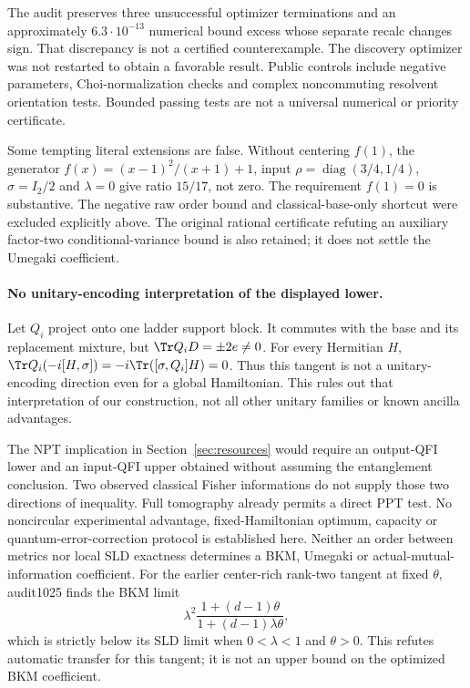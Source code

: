 The audit preserves three unsuccessful optimizer terminations and an approximately \(6.3\cdot10^{-13}\) numerical bound excess whose separate recalc changes sign. That discrepancy is not a certified counterexample. The discovery optimizer was not restarted to obtain a favorable result. Public controls include negative parameters, Choi-normalization checks and complex noncommuting resolvent orientation tests. Bounded passing tests are not a universal numerical or priority certificate.

Some tempting literal extensions are false. Without centering \(f(1)\), the generator \(f(x)=(x-1)^2/(x+1)+1\), input \(\rho=\operatorname{diag}(3/4,1/4)\), \(\sigma=I_2/2\) and \(\lambda=0\) give ratio \(15/17\), not zero. The requirement \(f(1)=0\) is substantive. The negative raw order bound and classical-base-only shortcut were excluded explicitly above. The original rational certificate refuting an auxiliary factor-two conditional-variance bound is also retained; it does not settle the Umegaki coefficient.

\paragraph{No unitary-encoding interpretation of the displayed lower.}
Let \(Q_i\) project onto one ladder support block. It commutes with the base and its replacement mixture, but \(\Tr Q_iD=\pm2e\ne0\). For every Hermitian \(H\),
\(\Tr Q_i(-i[H,\sigma])=-i\Tr([\sigma,Q_i]H)=0\).
Thus this tangent is not a unitary-encoding direction even for a global Hamiltonian. This rules out that interpretation of our construction, not all other unitary families or known ancilla advantages.

The NPT implication in Section~\ref{sec:resources} would require an output-QFI lower and an input-QFI upper obtained without assuming the entanglement conclusion. Two observed classical Fisher informations do not supply those two directions of inequality. Full tomography already permits a direct PPT test. No noncircular experimental advantage, fixed-Hamiltonian optimum, capacity or quantum-error-correction protocol is established here. Neither an order between metrics nor local SLD exactness determines a BKM, Umegaki or actual-mutual-information coefficient. For the earlier center-rich rank-two tangent at fixed $\theta$, audit1025 finds the BKM limit
\[
 \lambda^2\frac{1+(d-1)\theta}{1+(d-1)\lambda\theta},
\]
which is strictly below its SLD limit when $0<\lambda<1$ and $\theta>0$. This refutes automatic transfer for this tangent; it is not an upper bound on the optimized BKM coefficient.

